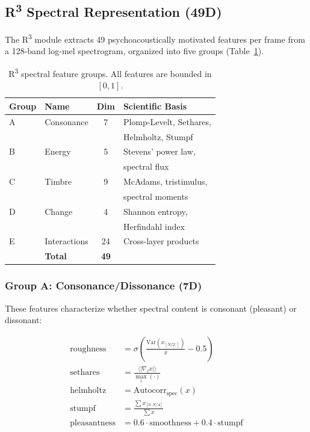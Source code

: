 \documentclass[10pt,twocolumn]{article}
\newcommand{\Rtri}{R\textsuperscript{3}}
\newcommand{\sigmoid}{\sigma}
\begin{document}
\subsection{\Rtri{} Spectral Representation (49D)}
\label{sec:r3}

The \Rtri{} module extracts 49 psychoacoustically motivated features per frame from a 128-band log-mel spectrogram, organized into five groups (Table~\ref{tab:r3}).

\begin{table}[t]
\centering
\caption{\Rtri{} spectral feature groups. All features are bounded in $[0, 1]$.}
\label{tab:r3}
\small
\begin{tabular}{@{}llcl@{}}
\toprule
\textbf{Group} & \textbf{Name} & \textbf{Dim} & \textbf{Scientific Basis} \\
\midrule
A & Consonance & 7 & Plomp-Levelt, Sethares, \\
  &            &   & Helmholtz, Stumpf \\
B & Energy     & 5 & Stevens' power law, \\
  &            &   & spectral flux \\
C & Timbre     & 9 & McAdams, tristimulus, \\
  &            &   & spectral moments \\
D & Change     & 4 & Shannon entropy, \\
  &            &   & Herfindahl index \\
E & Interactions & 24 & Cross-layer products \\
\midrule
  & \textbf{Total} & \textbf{49} & \\
\bottomrule
\end{tabular}
\end{table}

\subsubsection{Group A: Consonance/Dissonance (7D)}

These features characterize whether spectral content is consonant (pleasant) or dissonant:

\begin{align}
\text{roughness} &= \sigmoid\!\left(\frac{\text{Var}(x_{[N/2:]})}{\bar{x}} - 0.5\right) \label{eq:roughness} \\
\text{sethares} &= \frac{\langle|\nabla_f x|\rangle}{\max_t(\cdot)} \label{eq:sethares} \\
\text{helmholtz} &= \text{Autocorr}_\text{spec}(x) \label{eq:helmholtz} \\
\text{stumpf} &= \frac{\textstyle\sum x_{[0:N/4]}}{\textstyle\sum x} \label{eq:stumpf} \\
\text{pleasantness} &= 0.6 \cdot \text{smoothness} + 0.4 \cdot \text{stumpf} \label{eq:pleasantness}
\end{align}
\end{document}
